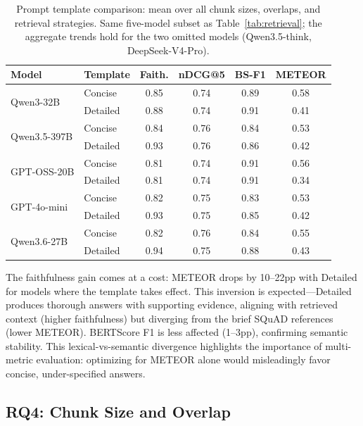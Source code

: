 \begin{table}[t]
\centering
\caption{Prompt template comparison: mean over all chunk sizes, overlaps, and retrieval strategies. Same five-model subset as Table~\ref{tab:retrieval}; the aggregate trends hold for the two omitted models (Qwen3.5-think, DeepSeek-V4-Pro).}
\label{tab:template}
\begin{tabular}{llcccc}
\toprule
\textbf{Model} & \textbf{Template} & \textbf{Faith.} & \textbf{nDCG@5} & \textbf{BS-F1} & \textbf{METEOR} \\
\midrule
\multirow{2}{*}{Qwen3-32B}    & Concise  & 0.85 & 0.74 & 0.89 & 0.58 \\
                               & Detailed & 0.88 & 0.74 & 0.91 & 0.41 \\
\multirow{2}{*}{Qwen3.5-397B} & Concise  & 0.84 & 0.76 & 0.84 & 0.53 \\
                               & Detailed & 0.93 & 0.76 & 0.86 & 0.42 \\
\multirow{2}{*}{GPT-OSS-20B}  & Concise  & 0.81 & 0.74 & 0.91 & 0.56 \\
                               & Detailed & 0.81 & 0.74 & 0.91 & 0.34 \\
\multirow{2}{*}{GPT-4o-mini}  & Concise  & 0.82 & 0.75 & 0.83 & 0.53 \\
                               & Detailed & 0.93 & 0.75 & 0.85 & 0.42 \\
\multirow{2}{*}{Qwen3.6-27B}  & Concise  & 0.82 & 0.76 & 0.84 & 0.55 \\
                               & Detailed & 0.94 & 0.75 & 0.88 & 0.43 \\
\bottomrule
\end{tabular}
\end{table}

The faithfulness gain comes at a cost: METEOR drops by 10--22pp with Detailed for models where the template takes effect. This inversion is expected---Detailed produces thorough answers with supporting evidence, aligning with retrieved context (higher faithfulness) but diverging from the brief SQuAD references (lower METEOR). BERTScore F1 is less affected (1--3pp), confirming semantic stability. This lexical-vs-semantic divergence highlights the importance of multi-metric evaluation: optimizing for METEOR alone would misleadingly favor concise, under-specified answers.

\subsection{RQ4: Chunk Size and Overlap}

